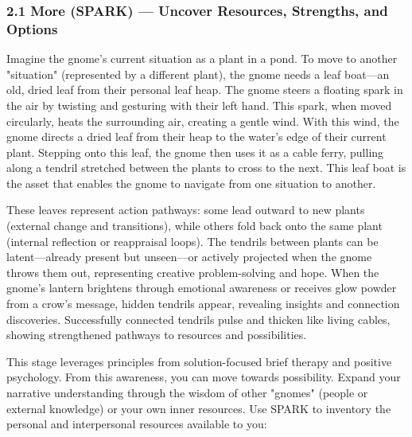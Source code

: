 \documentclass{article}
\begin{document}
\subsubsection{2.1 More (SPARK) — Uncover Resources, Strengths, and Options}
Imagine the gnome's current situation as a plant in a pond. To move to another "situation" (represented by a different plant), the gnome needs a leaf boat—an old, dried leaf from their personal leaf heap. The gnome steers a floating spark in the air by twisting and gesturing with their left hand. This spark, when moved circularly, heats the surrounding air, creating a gentle wind. With this wind, the gnome directs a dried leaf from their heap to the water's edge of their current plant. Stepping onto this leaf, the gnome then uses it as a cable ferry, pulling along a tendril stretched between the plants to cross to the next. This leaf boat is the asset that enables the gnome to navigate from one situation to another.

These leaves represent action pathways: some lead outward to new plants (external change and transitions), while others fold back onto the same plant (internal reflection or reappraisal loops). The tendrils between plants can be latent—already present but unseen—or actively projected when the gnome throws them out, representing creative problem-solving and hope. When the gnome's lantern brightens through emotional awareness or receives glow powder from a crow's message, hidden tendrils appear, revealing insights and connection discoveries. Successfully connected tendrils pulse and thicken like living cables, showing strengthened pathways to resources and possibilities.

This stage leverages principles from solution-focused brief therapy and positive psychology. From this awareness, you can move towards possibility. Expand your narrative understanding through the wisdom of other "gnomes" (people or external knowledge) or your own inner resources. Use SPARK to inventory the personal and interpersonal resources available to you:
\end{document}
